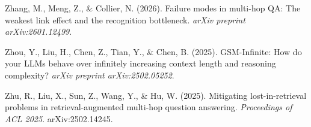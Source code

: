 \documentclass[
]{article}
\begin{document}
Zhang, M., Meng, Z., \& Collier, N. (2026). Failure modes in multi-hop
QA: The weakest link effect and the recognition bottleneck. \emph{arXiv
preprint arXiv:2601.12499}.

Zhou, Y., Liu, H., Chen, Z., Tian, Y., \& Chen, B. (2025). GSM-Infinite:
How do your LLMs behave over infinitely increasing context length and
reasoning complexity? \emph{arXiv preprint arXiv:2502.05252}.

Zhu, R., Liu, X., Sun, Z., Wang, Y., \& Hu, W. (2025). Mitigating
lost-in-retrieval problems in retrieval-augmented multi-hop question
answering. \emph{Proceedings of ACL 2025}. arXiv:2502.14245.
\end{document}
